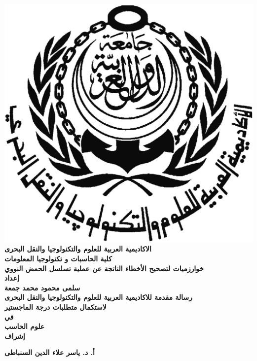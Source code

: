 \documentclass[12pt,openany]{llncs}
\begin{document}
\begin{titlepage}
{\small
\center %
\includegraphics[scale=0.2]{./figs/aast}\\[0.7cm]
{\large \bfseries 
الاكاديمية العربية للعلوم والتكنولوجيا والنقل البحرى
}\\[0.7cm]
{\large \bfseries 
كلية الحاسبات و تكنولوجيا المعلومات
}\\[1.3cm]
{\LARGE \bfseries 
خوارزميات لتصحيح الأخطاء الناتجة عن عملية تسلسل الحمض النووي
}\\[0.5cm]
{\large \bfseries 
إعداد
}\\[0.3cm]
{\large \bfseries
سلمى محمود محمد جمعة
}\\[0.3cm]
{\bfseries 
رسالة مقدمة للاكاديمية العربية للعلوم والتكنولوجيا والنقل البحرى
}\\[0.2cm]
{\bfseries
لاستكمال متطلبات درجة الماجستير
}\\[0.2cm]
{\bfseries
في
}\\[0.2cm]
{\large \bfseries
علوم الحاسب 
}\\[0.3cm]
{\large \bfseries 
إشراف
}\\[0.3cm]
\begin{minipage}{0.55\textwidth}
{\large \bfseries 
أ. د. ياسر علاء الدين السنباطى
}
\end{minipage}
~
\begin{minipage}{0.40\textwidth}

\end{minipage}}
\end{titlepage}
\end{document}
